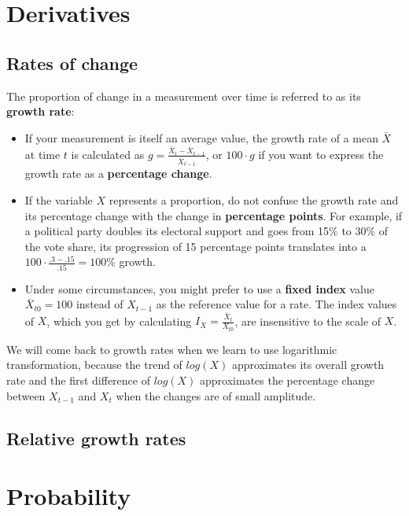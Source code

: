\section{Derivatives}
  \subsection{Rates of change}
%
The proportion of change in a measurement over time is referred to as its \textbf{growth rate}:

\begin{itemize}
	\item If your measurement is itself an average value, the growth rate of a mean $\bar{X}$ at time $t$ is calculated as $g = \frac{\bar{X}_t - \bar{X}_{t-1}}{\bar{X}_{t-1}}$, or $100 \cdot g$ if you want to express the growth rate as a \textbf{percentage change}.

	\item If the variable $X$ represents a proportion, do not confuse the growth rate and its percentage change with the change in \textbf{percentage points}. For example, if a political party doubles its electoral support and goes from 15\% to 30\% of the vote share, its progression of 15 percentage points translates into a $100 \cdot \frac{.3-.15}{.15} = 100\%$ growth.
	
	\item Under some circumstances, you might prefer to use a \textbf{fixed index} value $\bar{X}_{t0} = 100$ instead of $X_{t-1}$ as the reference value for a rate. The index values of $X$, which you get by calculating $I_X = \frac{\bar{X}_t}{X_{t0}}$, are insensitive to the scale of $X$.
	\end{itemize}

We will come back to growth rates when we learn to use logarithmic transformation, because the trend of $log(X)$ approximates its overall growth rate and the first difference of $log(X)$ approximates the percentage change between $X_{t-1}$ and $X_t$ when the changes are of small amplitude.


  
  \subsection{Relative growth rates}

\section{Probability}

